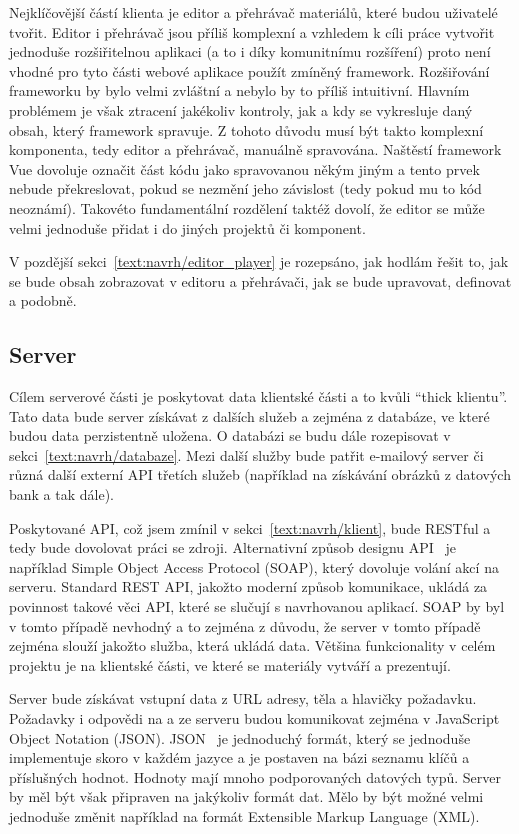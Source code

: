 Nejklíčovější částí klienta je editor a přehrávač materiálů, které budou uživatelé tvořit.
Editor i přehrávač jsou příliš komplexní a vzhledem k cíli práce vytvořit jednoduše rozšiřitelnou aplikaci (a to i díky komunitnímu rozšíření) proto není vhodné pro tyto části webové aplikace použít zmíněný framework.
Rozšiřování frameworku by bylo velmi zvláštní a nebylo by to příliš intuitivní.
Hlavním problémem je však ztracení jakékoliv kontroly, jak a kdy se vykresluje daný obsah, který framework spravuje.
Z tohoto důvodu musí být takto komplexní komponenta, tedy editor a přehrávač, manuálně spravována.
Naštěstí framework Vue dovoluje označit část kódu jako spravovanou někým jiným a tento prvek nebude překreslovat, pokud se nezmění jeho závislost (tedy pokud mu to kód neoznámí). 
Takovéto fundamentální rozdělení taktéž dovolí, že editor se může velmi jednoduše přidat i do jiných projektů či komponent.

V pozdější sekci~\ref{text:navrh/editor_player} je rozepsáno, jak hodlám řešit to, jak se bude obsah zobrazovat v editoru a přehrávači, jak se bude upravovat, definovat a podobně.

\subsection{Server}\label{text:navrh/server}

Cílem serverové části je poskytovat data klientské části a to kvůli \enquote{thick klientu}. 
Tato data bude server získávat z dalších služeb a zejména z databáze, ve které budou data perzistentně uložena.
O databázi se budu dále rozepisovat v sekci~\ref{text:navrh/databaze}.
Mezi další služby bude patřit e-mailový server či různá další externí API třetích služeb (například na získávání obrázků z datových bank a tak dále).

Poskytované API, což jsem zmínil v sekci~\ref{text:navrh/klient}, bude RESTful a tedy bude dovolovat práci se zdroji. 
Alternativní způsob designu API~\cite{richardson_2013} je například Simple Object Access Protocol (SOAP), který dovoluje volání akcí na serveru.
Standard REST API, jakožto moderní způsob komunikace, ukládá za povinnost takové věci API, které se slučují s navrhovanou aplikací.
SOAP by byl v tomto případě nevhodný a to zejména z důvodu, že server v tomto případě zejména slouží jakožto služba, která ukládá data.
Většina funkcionality v celém projektu je na klientské části, ve které se materiály vytváří a prezentují.

Server bude získávat vstupní data z URL adresy, těla a hlavičky požadavku.
Požadavky i odpovědi na a ze serveru budou komunikovat zejména v JavaScript Object Notation (JSON).
JSON~\cite{richardson_2013, uzayr2022frontend} je jednoduchý formát, který se jednoduše implementuje skoro v každém jazyce a je postaven na bázi seznamu klíčů a příslušných hodnot.
Hodnoty mají mnoho podporovaných datových typů.
Server by měl být však připraven na jakýkoliv formát dat.
Mělo by být možné velmi jednoduše změnit například na formát Extensible Markup Language (XML).


